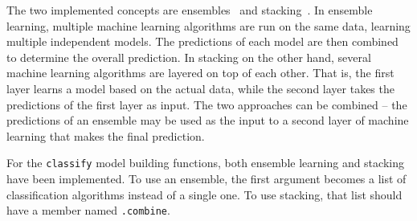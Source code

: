 \documentclass{article}\usepackage[]{graphicx}\usepackage[]{color}
\begin{document}
The two implemented concepts are ensembles~\cite{dietterich_ensemble_2000} and
stacking~\cite{wolpert_stacked_1992}. In ensemble learning, multiple machine
learning algorithms are run on the same data, learning multiple independent
models. The predictions of each model are then combined to determine the overall
prediction. In stacking on the other hand, several machine learning algorithms
are layered on top of each other. That is, the first layer learns a model based
on the actual data, while the second layer takes the predictions of the first
layer as input. The two approaches can be combined -- the predictions of an
ensemble may be used as the input to a second layer of machine learning that
makes the final prediction.

For the \lstinline{classify} model building functions, both ensemble learning
and stacking have been implemented. To use an ensemble, the first argument
becomes a list of classification algorithms instead of a single one. To use
stacking, that list should have a member named \lstinline{.combine}.
\end{document}
